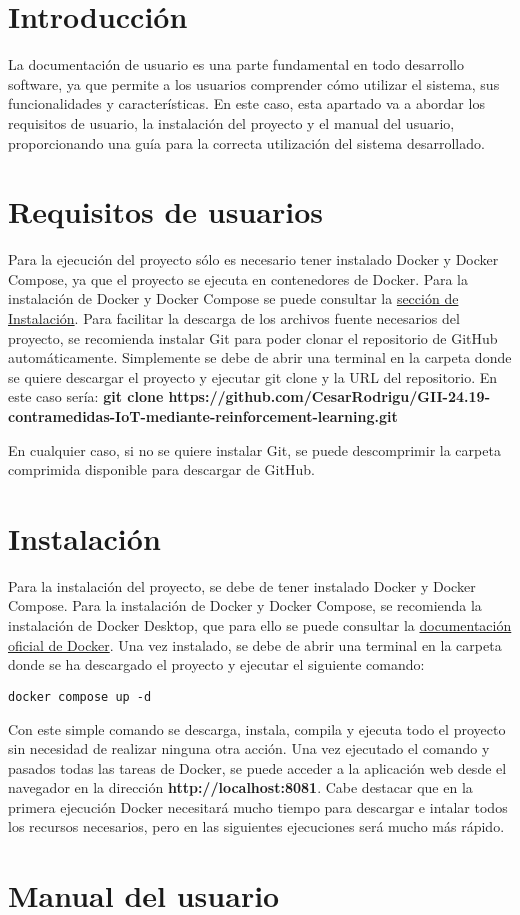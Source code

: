 
\section{Introducción}
La documentación de usuario es una parte fundamental en todo desarrollo software, ya que permite a los usuarios comprender cómo utilizar el sistema, sus funcionalidades y características. En este caso, esta apartado va a abordar los requisitos de usuario, la instalación del proyecto y el manual del usuario, proporcionando una guía para la correcta utilización del sistema desarrollado.

\section{Requisitos de usuarios}
\label{sec:requisitos-usuarios}

Para la ejecución del proyecto sólo es necesario tener instalado Docker y Docker Compose, ya que el proyecto se ejecuta en contenedores de Docker. Para la instalación de Docker y Docker Compose se puede consultar la \hyperref[sec:instalacion]{sección de Instalación}.
Para facilitar la descarga de los archivos fuente necesarios del proyecto, se recomienda instalar Git para poder clonar el repositorio de GitHub automáticamente. Simplemente se debe de abrir una terminal en la carpeta donde se quiere descargar el proyecto y ejecutar git clone y la URL del repositorio. En este caso sería: \textbf{git clone https://github.com/CesarRodrigu/GII-24.19-contramedidas-IoT-mediante-reinforcement-learning.git}

En cualquier caso, si no se quiere instalar Git, se puede descomprimir la carpeta comprimida disponible para descargar de GitHub.

\section{Instalación}
\label{sec:instalacion}
Para la instalación del proyecto, se debe de tener instalado Docker y Docker Compose. Para la instalación de Docker y Docker Compose, se recomienda la instalación de Docker Desktop, que para ello se puede consultar la \href{https://docs.docker.com/get-docker/}{documentación oficial de Docker}. Una vez instalado, se debe de abrir una terminal en la carpeta donde se ha descargado el proyecto y ejecutar el siguiente comando:
\begin{verbatim}
docker compose up -d
\end{verbatim}
Con este simple comando se descarga, instala, compila y ejecuta todo el proyecto sin necesidad de realizar ninguna otra acción.
Una vez ejecutado el comando y pasados todas las tareas de Docker, se puede acceder a la aplicación web desde el navegador en la dirección \textbf{http://localhost:8081}. Cabe destacar que en la primera ejecución Docker necesitará mucho tiempo para descargar e intalar todos los recursos necesarios, pero en las siguientes ejecuciones será mucho más rápido.

\section{Manual del usuario}


